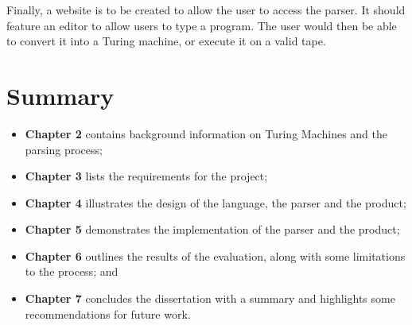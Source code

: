Finally, a website is to be created to allow the user to access the parser. It should feature an editor to allow users to type a program. The user would then be able to convert it into a Turing machine, or execute it on a valid tape.

\section{Summary}
\begin{itemize}
    \item \textbf{Chapter 2} contains background information on Turing Machines and the parsing process;
    \item \textbf{Chapter 3} lists the requirements for the project;
    \item \textbf{Chapter 4} illustrates the design of the language, the parser and the product;
    \item \textbf{Chapter 5} demonstrates the implementation of the parser and the product;
    \item \textbf{Chapter 6} outlines the results of the evaluation, along with some limitations to the process; and
    \item \textbf{Chapter 7} concludes the dissertation with a summary and highlights some recommendations for future work.
\end{itemize}

